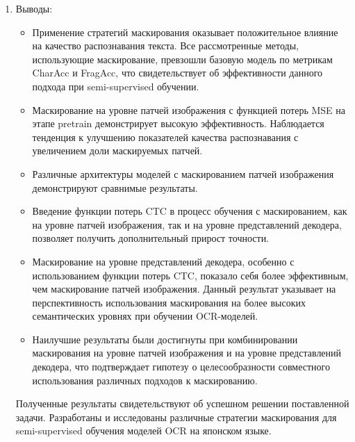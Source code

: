\begin{enumerate}
   \item Выводы:
   
   \begin{itemize}
     \item Применение стратегий маскирования оказывает положительное влияние на качество распознавания текста. Все рассмотренные методы, использующие маскирование, превзошли базовую модель по метрикам CharAcc и FragAcc, что свидетельствует об эффективности данного подхода при semi-supervised обучении.
     
     \item Маскирование на уровне патчей изображения с функцией потерь MSE на этапе pretrain демонстрирует высокую эффективность. Наблюдается тенденция к улучшению показателей качества распознавания с увеличением доли маскируемых патчей.
     
     \item Различные архитектуры моделей с маскированием патчей изображения демонстрируют сравнимые результаты.

     \item Введение функции потерь CTC в процесс обучения с маскированием, как на уровне патчей изображения, так и на уровне представлений декодера, позволяет получить дополнительный прирост точности.
     
     \item Маскирование на уровне представлений декодера, особенно с использованием функции потерь CTC, показало себя более эффективным, чем маскирование патчей изображения. Данный результат указывает на перспективность использования маскирования на более высоких семантических уровнях при обучении OCR-моделей.

     \item Наилучшие результаты были достигнуты при комбинировании маскирования на уровне патчей изображения и на уровне представлений декодера, что подтверждает гипотезу о целесообразности совместного использования различных подходов к маскированию.

   \end{itemize}

   Полученные результаты свидетельствуют об успешном решении поставленной задачи. Разработаны и исследованы различные стратегии маскирования для semi-supervised обучения моделей OCR на японском языке. 
\end{enumerate}

\newpage
